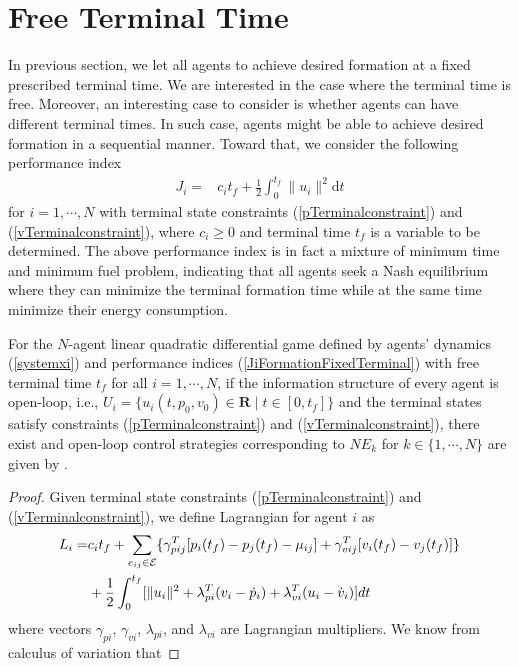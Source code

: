\documentclass[12pt,draftcls,onecolumn]{IEEEtran}  %
\begin{document}
{\section{Free Terminal Time}
In previous section, we let all agents to achieve desired formation at a fixed prescribed terminal time. We are interested in the case where the terminal time is free. Moreover, an interesting case to consider is whether agents can have different terminal times. In such case, agents might be able to achieve desired formation in a sequential manner. Toward that, we consider the following performance index
\begin{align}
J_i=&c_it_f+\frac{1}{2}\int^{t_f}_0 \|u_i\|^2 \mbox{d}t\label{JiFormationFixedTerminal}
\end{align}
for $i=1,\cdots,N$ with terminal state constraints (\ref{pTerminalconstraint}) and (\ref{vTerminalconstraint}), where $c_i\geq0$ and terminal time $t_f$ is a variable to be determined. The above performance index is in fact a mixture of minimum time and minimum fuel problem, indicating that all agents seek a Nash equilibrium where they can minimize the terminal formation time while at the same time minimize their energy consumption.
\begin{thm}
For the $N$-agent linear quadratic differential game defined by agents' dynamics (\ref{systemxi}) and performance indices (\ref{JiFormationFixedTerminal}) with free terminal time $t_f$ for all $i=1,\cdots,N$, if the information structure of every agent is open-loop, i.e., $U_i=\{u_i(t,p_0,v_0)\in \mathbf{R} \mid t\in[0,t_f]\}$ and the terminal states satisfy constraints (\ref{pTerminalconstraint}) and (\ref{vTerminalconstraint}), there exist and open-loop control strategies corresponding to $NE_k$ for $k\in\{1,\cdots,N\}$ are given by
.
\end{thm}
\begin{proof}
Given terminal state constraints (\ref{pTerminalconstraint}) and (\ref{vTerminalconstraint}), we define Lagrangian for agent $i$ as
\begin{align}
L_i=&c_it_f+\sum_{e_{ij}\in\mathcal{E}}\{\gamma^T_{pij}
[p_i(t_f)-p_j(t_f)-\mu_{ij}]+\gamma^T_{vij}
[v_i(t_f)-v_j(t_f)]\}\notag\\
&+\frac{1}{2}\int_0^{t_f} [\|u_i\|^2+ \lambda_{pi}^T(v_i-\dot{p}_i)+
\lambda_{vi}^T(u_i-\dot{v}_i)]\mbox{d}t
\end{align}
where vectors $\gamma_{pi}$, $\gamma_{vi}$, $\lambda_{pi}$, and $\lambda_{vi}$ are Lagrangian multipliers. We know from calculus of variation that

\end{proof}}
\end{document}
